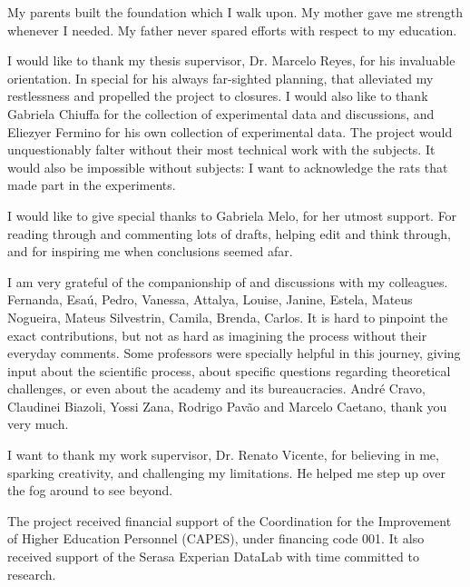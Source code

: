 My parents built the foundation which I walk upon. My mother gave me strength whenever I needed. My father never spared efforts with respect to my education.

I would like to thank my thesis supervisor, Dr. Marcelo Reyes, for his invaluable orientation. In special for his always far-sighted planning, that alleviated my restlessness and propelled the project to closures. I would also like to thank Gabriela Chiuffa for the collection of experimental data and discussions, and Eliezyer Fermino for his own collection of experimental data. The project would unquestionably falter without their most technical work with the subjects. It would also be impossible without subjects: I want to acknowledge the rats that made part in the experiments.

I would like to give special thanks to Gabriela Melo, for her utmost support. For reading through and commenting lots of drafts, helping edit and think through, and for inspiring me when conclusions seemed afar.

I am very grateful of the companionship of and discussions with my colleagues. Fernanda, Esaú, Pedro, Vanessa, Attalya, Louise, Janine, Estela, Mateus Nogueira, Mateus Silvestrin, Camila, Brenda, Carlos. It is hard to pinpoint the exact contributions, but not as hard as imagining the process without their everyday comments. Some professors were specially helpful in this journey, giving input about the scientific process, about specific questions regarding theoretical challenges, or even about the academy and its bureaucracies. André Cravo, Claudinei Biazoli, Yossi Zana, Rodrigo Pavão and Marcelo Caetano, thank you very much.

I want to thank my work supervisor, Dr. Renato Vicente, for believing in me, sparking creativity, and challenging my limitations. He helped me step up over the fog around to see beyond.

The project received financial support of the Coordination for the Improvement of Higher Education Personnel (CAPES), under financing code 001. It also received support of the Serasa Experian DataLab with time committed to research.

